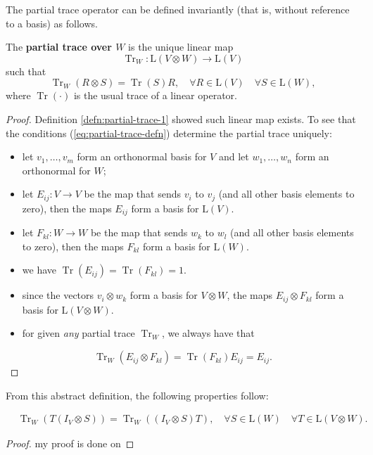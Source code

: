 The partial trace operator can be defined invariantly (that is, without reference to a basis) as follows.

\begin{definition}
The \textbf{partial trace over $W$} is the unique linear map
$$
\operatorname{Tr}_W: \mathrm{L}(V \otimes W) \rightarrow \mathrm{L}(V)
$$
such that
\begin{equation}\label{eq:partial-trace-defn}
    \operatorname{Tr}_W(R \otimes S)=\operatorname{Tr}(S) R, \quad \forall R \in \mathrm{L}(V) \quad \forall S \in \mathrm{L}(W),
\end{equation}
where $\operatorname{Tr}(\cdot)$ is the usual trace of a linear operator.
\end{definition}

\begin{proof} %
Definition \ref{defn:partial-trace-1} showed such linear map exists.
To see that the conditions (\ref{eq:partial-trace-defn}) determine the partial trace uniquely:
\begin{itemize}
  \item let $v_1, \ldots, v_m$ form an orthonormal basis for $V$ and let $w_1, \ldots, w_n$ form an orthonormal for $W$;
  \item let $E_{i j}: V \rightarrow V$ be the map that sends $v_i$ to $v_j$ (and all other basis elements to zero), then the maps $E_{i j}$ form a basis for $\mathrm{L}(V)$.
  \item let $F_{k l}: W \rightarrow W$ be the map that sends $w_k$ to $w_l$ (and all other basis elements to zero), then the maps $F_{k l}$ form a basis for $\mathrm{L}(W)$.
  \item we have $\operatorname{Tr}(E_{ij})=\operatorname{Tr}(F_{kl})=1.$
  \item since the vectors $v_i \otimes w_k$ form a basis for $V \otimes W$, the maps $E_{i j} \otimes F_{k l}$ form a basis for $\mathrm{L}(V \otimes W)$.
  \item for given \textit{any} partial trace $\operatorname{Tr}_W$, we always have that
\end{itemize}
$$
\operatorname{Tr}_W(E_{i j} \otimes F_{k l})=\operatorname{Tr}(F_{k l}) E_{i j} = E_{i j}.
$$
\end{proof}

From this abstract definition, the following properties follow:

\begin{proposition}
$$
\begin{aligned}
& \operatorname{Tr}_W\left(T\left(I_V \otimes S\right)\right)=\operatorname{Tr}_W\left(\left(I_V \otimes S\right) T\right) ,\quad \forall S \in \mathrm{L}(W) \quad \forall T \in \mathrm{L}(V \otimes W).
\end{aligned}
$$
\end{proposition}

\begin{proof}
    my proof is done on
\end{proof}